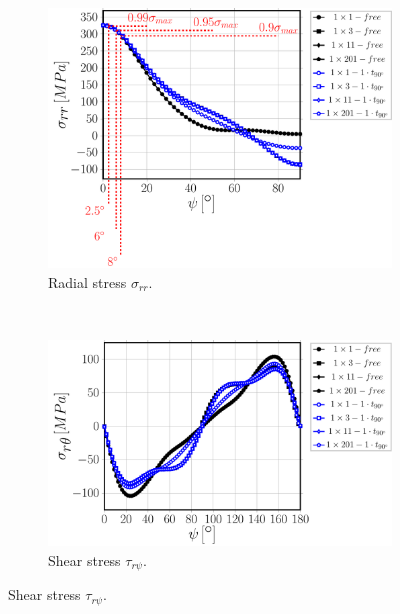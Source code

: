 \begin{figure}[!hp]
\centering
    \begin{subfigure}[b]{0.4\textwidth}
        \includegraphics[width=\textwidth]{paperE/vf60-nodamage-sigmar.pdf}
        \caption{Radial stress $\sigma_{rr}$.}\label{chap3:paperE:fig:stress-a}
    \end{subfigure} ~
    \begin{subfigure}[b]{0.4\textwidth}
        \includegraphics[width=\textwidth]{paperE/vf60-nodamage-taurt.pdf}
        \caption{Shear stress $\tau_{r\psi}$.}\label{chap3:paperE:fig:stress-b}
    \end{subfigure}


\end{figure}

